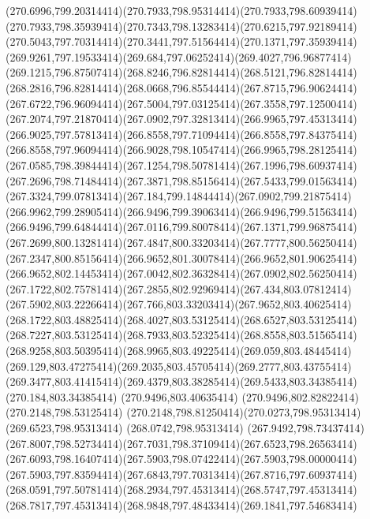 {{	\curveto(270.6996,799.20314414)(270.7933,798.95314414)(270.7933,798.60939414)
	\curveto(270.7933,798.35939414)(270.7343,798.13283414)(270.6215,797.92189414)
	\curveto(270.5043,797.70314414)(270.3441,797.51564414)(270.1371,797.35939414)
	\curveto(269.9261,797.19533414)(269.684,797.06252414)(269.4027,796.96877414)
	\curveto(269.1215,796.87507414)(268.8246,796.82814414)(268.5121,796.82814414)
	\curveto(268.2816,796.82814414)(268.0668,796.85544414)(267.8715,796.90624414)
	\curveto(267.6722,796.96094414)(267.5004,797.03125414)(267.3558,797.12500414)
	\curveto(267.2074,797.21870414)(267.0902,797.32813414)(266.9965,797.45313414)
	\curveto(266.9025,797.57813414)(266.8558,797.71094414)(266.8558,797.84375414)
	\curveto(266.8558,797.96094414)(266.9028,798.10547414)(266.9965,798.28125414)
	\curveto(267.0585,798.39844414)(267.1254,798.50781414)(267.1996,798.60937414)
	\curveto(267.2696,798.71484414)(267.3871,798.85156414)(267.5433,799.01563414)
	\curveto(267.3324,799.07813414)(267.184,799.14844414)(267.0902,799.21875414)
	\curveto(266.9962,799.28905414)(266.9496,799.39063414)(266.9496,799.51563414)
	\curveto(266.9496,799.64844414)(267.0116,799.80078414)(267.1371,799.96875414)
	\curveto(267.2699,800.13281414)(267.4847,800.33203414)(267.7777,800.56250414)
	\curveto(267.2347,800.85156414)(266.9652,801.30078414)(266.9652,801.90625414)
	\curveto(266.9652,802.14453414)(267.0042,802.36328414)(267.0902,802.56250414)
	\curveto(267.1722,802.75781414)(267.2855,802.92969414)(267.434,803.07812414)
	\curveto(267.5902,803.22266414)(267.766,803.33203414)(267.9652,803.40625414)
	\curveto(268.1722,803.48825414)(268.4027,803.53125414)(268.6527,803.53125414)
	\curveto(268.7227,803.53125414)(268.7933,803.52325414)(268.8558,803.51565414)
	\curveto(268.9258,803.50395414)(268.9965,803.49225414)(269.059,803.48445414)
	\curveto(269.129,803.47275414)(269.2035,803.45705414)(269.2777,803.43755414)
	\curveto(269.3477,803.41415414)(269.4379,803.38285414)(269.5433,803.34385414)
	\lineto(270.184,803.34385414)
	\lineto(270.9496,803.40635414)
	\lineto(270.9496,802.82822414)
	\closepath
	\moveto(270.2148,798.53125414)
	\curveto(270.2148,798.81250414)(270.0273,798.95313414)(269.6523,798.95313414)
	\lineto(268.0742,798.95313414)
	\lineto(267.9492,798.73437414)
	\curveto(267.8007,798.52734414)(267.7031,798.37109414)(267.6523,798.26563414)
	\curveto(267.6093,798.16407414)(267.5903,798.07422414)(267.5903,798.00000414)
	\curveto(267.5903,797.83594414)(267.6843,797.70313414)(267.8716,797.60937414)
	\curveto(268.0591,797.50781414)(268.2934,797.45313414)(268.5747,797.45313414)
	\curveto(268.7817,797.45313414)(268.9848,797.48433414)(269.1841,797.54683414)
}}
